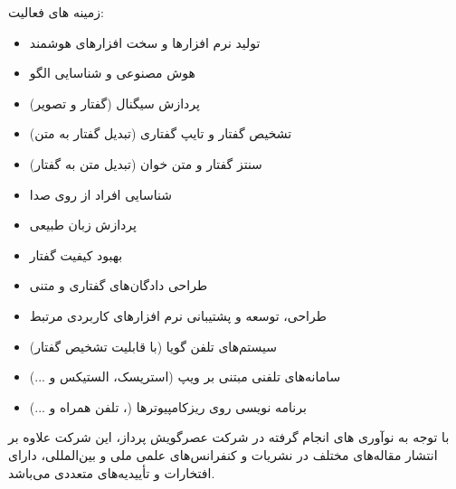 زمینه های فعالیت:
\begin{itemize}
	\item تولید نرم افزارها و سخت افزارهای هوشمند
	\item هوش مصنوعی و شناسایی الگو
	\item پردازش سیگنال (گفتار و تصویر)
	\item تشخیص گفتار و تایپ گفتاری (تبدیل گفتار به متن)
	\item سنتز گفتار و متن خوان (تبدیل متن به گفتار)
	\item شناسایی افراد از روی صدا
	\item پردازش زبان طبیعی
	\item بهبود كیفیت گفتار
	\item طراحی دادگان‌های گفتاری و متنی
	\item طراحی، توسعه و پشتیبانی نرم افزارهای کاربردی مرتبط
	\item سیستم‌های تلفن گویا (با قابلیت تشخیص گفتار)
	\item سامانه‌های تلفنی مبتنی بر ویپ (استریسک، الستیکس و ...)
	\item برنامه نویسی روی ریزکامپیوترها (، تلفن همراه و ...)
\end{itemize}

با توجه به نوآوری های انجام گرفته در شركت عصرگویش پرداز، این شرکت علاوه بر انتشار مقاله‌های مختلف در نشریات و کنفرانس‌های علمی ملی و بین‌المللی، دارای افتخارات و تأییدیه‌های متعددی می‌باشد.